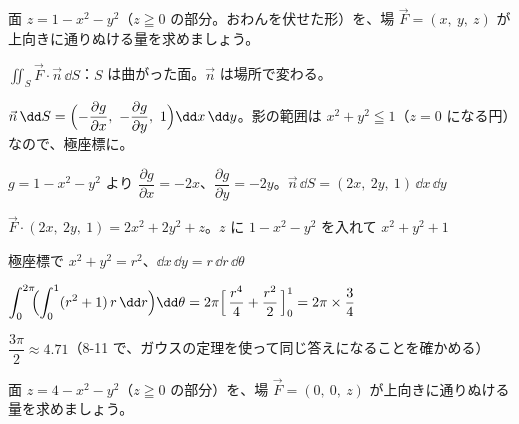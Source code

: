 \begin{reidai}
面 $z=1-x^2-y^2$（$z\geqq0$ の部分。おわんを伏せた形）を、場 $\vec F=(x,\ y,\ z)$ が上向きに通りぬける量を求めましょう。\par
\kangaekata {}\par
{}\enspace $\displaystyle\iint_S\vec F\cdot\vec n\,\dd S$：$S$ は曲がった面。$\vec n$ は場所で変わる。\par
{}\enspace $\vec n\,\dd S=\Bigl(-\dfrac{\partial g}{\partial x},\ -\dfrac{\partial g}{\partial y},\ 1\Bigr)\dd x\,\dd y$。影の範囲は $x^2+y^2\leqq1$（$z=0$ になる円）なので、極座標に。\par
\shiki\kviiiis{}\zw{} $g=1-x^2-y^2$ より $\dfrac{\partial g}{\partial x}=-2x$、$\dfrac{\partial g}{\partial y}=-2y$。$\vec n\,\dd S=(2x,\ 2y,\ 1)\,\dd x\,\dd y$\par
\kviiiia $\vec F\cdot(2x,\ 2y,\ 1)=2x^2+2y^2+z$。$z$ に $1-x^2-y^2$ を入れて $x^2+y^2+1$\par
\kviiiia 極座標で $x^2+y^2=r^2$、$\dd x\,\dd y=r\,\dd r\,\dd\theta$\par
\kviiiia $\displaystyle\int_0^{2\pi}\!\!\Bigl(\int_0^1(r^2+1)\,r\,\dd r\Bigr)\dd\theta=2\pi\Bigl[\,\frac{r^4}{4}+\frac{r^2}{2}\,\Bigr]_0^1=2\pi\times\frac34$\par
\kotae\kviiiis{}\zw{} $\dfrac{3\pi}{2}\approx4.71$（8-11 で、ガウスの定理を使って同じ答えになることを確かめる）
\end{reidai}

\begin{jibun}
面 $z=4-x^2-y^2$（$z\geqq0$ の部分）を、場 $\vec F=(0,\ 0,\ z)$ が上向きに通りぬける量を求めましょう。
\end{jibun}

